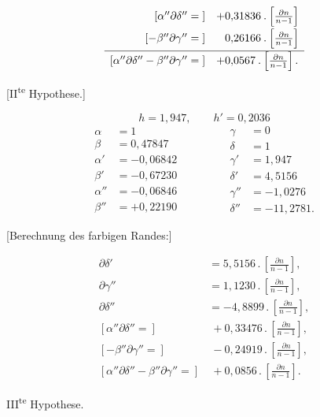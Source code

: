 \[
\begin{array}{r@{\quad}l}
[\alpha''\partial\delta''={}]&+0{,}31836\mathbin{.}\left[\frac{\partial n}{n-1}\right]\\[5pt]
{}[-\beta''\partial\gamma''={}]&\phantom{+}0{,}26166\mathbin{.}\left[\frac{\partial n}{n-1}\right]\\[5pt]\hline
{}[\alpha''\partial\delta''-\beta''\partial\gamma''={}]&+0{,}0567\mathbin{.}\left[\frac{\partial n}{n-1}\right].
\end{array}
\]
\begin{center}[II\textsuperscript{te} Hypothese.]\end{center}
\[
h=1{,}947,\qquad h'=0{,}2036
\]
\[
\begin{aligned}
\alpha&=1\\
\beta&=0{,}47847\\
\alpha'&=-0{,}06842\\
\beta'&=-0{,}67230\\
\alpha''&=-0{,}06846\\
\beta''&=+0{,}22190
\end{aligned}\qquad\qquad
\begin{aligned}
\gamma&=0\\
\delta&=1\\
\gamma'&=1{,}947\\
\delta'&=4{,}5156\\
\gamma''&=-1{,}0276\\
\delta''&=-11{,}2781.
\end{aligned}
\]
\begin{center}[Berechnung des farbigen Randes:]\end{center}
\[
\begin{aligned}
\partial\delta'&=5{,}5156\mathbin{.}\left[\frac{\partial n}{n-1}\right],\\[4pt]
\partial\gamma''&=1{,}1230\mathbin{.}\left[\frac{\partial n}{n-1}\right],\\[4pt]
\partial\delta''&=-4{,}8899\mathbin{.}\left[\frac{\partial n}{n-1}\right],\\[4pt]
{}[\alpha''\partial\delta''={}]&\ +0{,}33476\mathbin{.}\left[\frac{\partial n}{n-1}\right],\\[4pt]
{}[-\beta''\partial\gamma''={}]&\ -0{,}24919\mathbin{.}\left[\frac{\partial n}{n-1}\right],\\[4pt]
{}[\alpha''\partial\delta''-\beta''\partial\gamma''={}]&\ +0{,}0856\mathbin{.}\left[\frac{\partial n}{n-1}\right].
\end{aligned}
\]
\begin{center}III\textsuperscript{te} Hypothese.\end{center}
